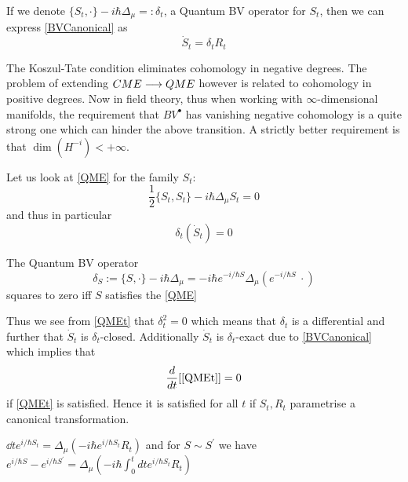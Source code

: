 If we denote $\{S_t, \cdot\} - i \hbar \Delta_\mu =: \delta_t$, a Quantum BV operator for $S_t$, then we can express \eqref{BVCanonical} as
\begin{equation}
  \dot S_t = \delta_t R_t
\end{equation}

\begin{rem}
  The Koszul-Tate condition eliminates cohomology in negative degrees. The problem of extending $CME \longrightarrow QME$ however is related to cohomology in positive degrees. Now in field theory, thus when working with $\infty$-dimensional manifolds, the requirement that $BV^\bullet$ has vanishing negative cohomology is a quite strong one which can hinder the above transition. A strictly better requirement is that $\dim(H^{-i}) < + \infty$.
\end{rem}

Let us look at \eqref{QME} for the family $S_t$:
\begin{equation}\tag{$QME_t$}\label{QMEt}
  \frac{1}{2} \{S_t,S_t\} - i \hbar \Delta_\mu S_t = 0
\end{equation}
and thus in particular
\begin{equation}
  \delta_t (\dot S_t) = 0
\end{equation}

\begin{lem}
  The Quantum BV operator
  \begin{equation}
    \delta_S := \{S, \cdot\} - i \hbar \Delta_\mu = -i \hbar e^{-i/\hbar S} \Delta_\mu \left( e^{-i/\hbar S} \ \cdot \right)
  \end{equation}
  squares to zero iff $S$ satisfies the \eqref{QME}
\end{lem}

Thus we see from \eqref{QMEt} that $\delta_t^2 = 0$ which means that $\delta_t$ is a differential and further that $\dot S_t$ is $\delta_t$-closed. Additionally $\dot S_t$ is $\delta_t$-exact due to \eqref{BVCanonical} which implies that
\begin{equation}
  \frac{d }{d t}[\eqref{QMEt}] = 0
\end{equation}
if \eqref{QMEt} is satisfied. Hence it is satisfied for all $t$ if $S_t, R_t$ parametrise a canonical transformation.

\begin{prop}
  $\dd{}{t} e^{i/\hbar S_t} = \Delta_\mu \left( - i \hbar e^{i/\hbar S_t} R_t \right)$ and for $S \sim S^\prime$ we have $e^{i/\hbar S} - e^{i/\hbar S^\prime} = \Delta_\mu \left( - i \hbar \int_0^t dt e^{i/\hbar S_t} R_t \right)$
\end{prop}

